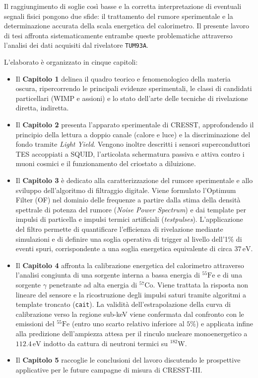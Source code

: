 Il raggiungimento di soglie così basse e la corretta interpretazione di eventuali segnali fisici pongono due sfide: il trattamento del rumore sperimentale e la determinazione accurata della scala energetica del calorimetro. Il presente lavoro di tesi affronta sistematicamente entrambe queste problematiche attraverso l'analisi dei dati acquisiti dal rivelatore \texttt{TUM93A}.

L'elaborato è organizzato in cinque capitoli:

\begin{itemize}
    \item Il \textbf{Capitolo 1} delinea il quadro teorico e fenomenologico della materia oscura, ripercorrendo le principali evidenze sperimentali, le classi di candidati particellari (WIMP e assioni) e lo stato dell'arte delle tecniche di rivelazione diretta, indiretta.
    
    \item Il \textbf{Capitolo 2} presenta l'apparato sperimentale di CRESST, approfondendo il principio della lettura a doppio canale (calore e luce) e la discriminazione del fondo tramite \textit{Light Yield}. Vengono inoltre descritti i sensori superconduttori TES accoppiati a SQUID, l'articolata schermatura passiva e attiva contro i muoni cosmici e il funzionamento del criostato a diluizione.

    \item Il \textbf{Capitolo 3} è dedicato alla caratterizzazione del rumore sperimentale e allo sviluppo dell'algoritmo di filtraggio digitale. Viene formulato l'Optimum Filter (OF) nel dominio delle frequenze a partire dalla stima della densità spettrale di potenza del rumore (\textit{Noise Power Spectrum}) e dai template per impulsi di particella e impulsi termici artificiali (\textit{testpulses}). L'applicazione del filtro permette di quantificare l'efficienza di rivelazione mediante simulazioni e di definire una soglia operativa di trigger al livello dell'1\% di eventi spuri, corrispondente a una soglia energetica equivalente di circa $37\,\text{eV}$.

    \item Il \textbf{Capitolo 4} affronta la calibrazione energetica del calorimetro attraverso l'analisi congiunta di una sorgente interna a bassa energia di $^{55}\text{Fe}$ e di una sorgente $\gamma$ penetrante ad alta energia di $^{57}\text{Co}$. Viene trattata la risposta non lineare del sensore e la ricostruzione degli impulsi saturi tramite algoritmi a template troncato (\texttt{cait}). La validità dell'estrapolazione della curva di calibrazione verso la regione sub-keV viene confermata dal confronto con le emissioni del $^{55}\text{Fe}$ (entro uno scarto relativo inferiore al $5\%$) e applicata infine alla predizione dell'ampiezza attesa per il rinculo nucleare monoenergetico a $112.4\,\text{eV}$ indotto da cattura di neutroni termici su $^{182}\text{W}$.

    \item Il \textbf{Capitolo 5} raccoglie le conclusioni del lavoro discutendo le prospettive applicative per le future campagne di misura di CRESST-III.
\end{itemize}